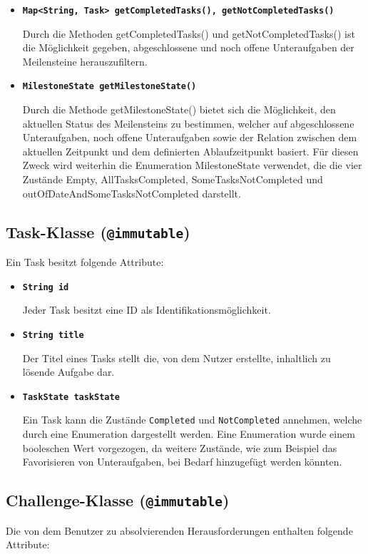 \documentclass[bibliography=totoc,listof=totoc,BCOR=5mm,DIV=12,oneside]{scrbook}
\begin{document}
{\begin{itemize}
\item[] \texttt{\textbf{Map<String, Task> getCompletedTasks(), getNotCompletedTasks()}}
\par Durch die Methoden getCompletedTasks() und getNotCompletedTasks() ist die Möglichkeit gegeben, abgeschlossene und noch offene Unteraufgaben der Meilensteine herauszufiltern.

\item[] \texttt{\textbf{MilestoneState getMilestoneState()}}
\par Durch die Methode getMilestoneState() bietet sich die Möglichkeit, den aktuellen Status des Meilensteins zu bestimmen, welcher auf abgeschlossene Unteraufgaben, noch offene Unteraufgaben sowie der Relation zwischen dem aktuellen Zeitpunkt und dem definierten Ablaufzeitpunkt basiert. Für diesen Zweck wird weiterhin die Enumeration MilestoneState verwendet, die die vier Zustände Empty, AllTasksCompleted, SomeTasksNotCompleted und outOfDateAndSomeTasksNotCompleted darstellt.
\end{itemize}

\newpage

\subsection{Task-Klasse (\texttt{@immutable})}
\par Ein Task besitzt folgende Attribute:

\begin{itemize}
\item[] \texttt{\textbf{String id}}
\par Jeder Task besitzt eine ID als Identifikationsmöglichkeit.

\item[] \texttt{\textbf{String title}}
\par Der Titel eines Tasks stellt die, von dem Nutzer erstellte, inhaltlich zu lösende Aufgabe dar.

\item[] \texttt{\textbf{TaskState taskState}}
\par Ein Task kann die Zustände \texttt{Completed} und \texttt{NotCompleted} annehmen, welche durch eine Enumeration dargestellt werden. Eine Enumeration wurde einem booleschen Wert vorgezogen, da weitere Zustände, wie zum Beispiel das Favorisieren von Unteraufgaben, bei Bedarf hinzugefügt werden könnten.
\end{itemize}

\subsection{Challenge-Klasse (\texttt{@immutable})}
Die von dem Benutzer zu absolvierenden Herausforderungen enthalten folgende Attribute:

}
\end{document}
